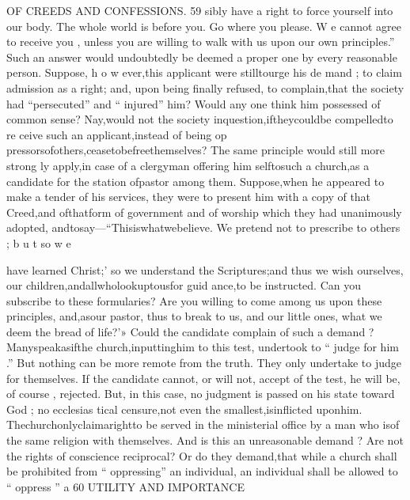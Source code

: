 \documentclass[
]{book}
\begin{document}
OF CREEDS AND CONFESSIONS. 59
sibly have a right to force yourself into our
body. The whole world is before you. Go
where you please. W e cannot agree to receive
you , unless you are willing to walk with us
upon our own principles.'' Such an answer
would undoubtedly be deemed a proper one
by every reasonable person. Suppose, h o w
ever,this applicant were stilltourge his de
mand ; to claim admission as a right; and,
upon being finally refused, to complain,that
the society had ``persecuted'' and `` injured''
him? Would any one think him possessed of
common sense? Nay,would not the society
inquestion,iftheycouldbe compelledto re
ceive such an applicant,instead of being op pressorsofothers,ceasetobefreethemselves?
The same principle would still more strong
ly apply,in case of a clergyman offering him
selftosuch a church,as a candidate for the
station ofpastor among them. Suppose,when
he appeared to make a tender of his services,
they were to present him with a copy of that
Creed,and ofthatform of government and of
worship which they had unanimously adopted, andtosay---``Thisiswhatwebelieve. We
pretend not to prescribe to others ; b u t so w e

have learned Christ;' so we understand the Scriptures;and thus we wish ourselves, our
children,andallwholookuptousfor guid ance,to be instructed. Can you subscribe to these formularies? Are you willing to come
among us upon these principles, and,asour pastor, thus to break to us, and our little ones, what we deem the bread of life?'» Could
the candidate complain of such a demand ? Manyspeakasifthe church,inputtinghim to this test, undertook to `` judge for him .'' But nothing can be more remote from the truth. They only undertake to judge for
themselves. If the candidate cannot, or will
not, accept of the test, he will be, of course ,
rejected. But, in this case, no judgment is
passed on his state toward God ; no ecclesias
tical censure,not even the smallest,isinflicted
uponhim. Thechurchonlyclaimarightto
be served in the ministerial office by a man
who isof the same religion with themselves. And is this an unreasonable demand ? Are
not the rights of conscience reciprocal? Or do they demand,that while a church shall be
prohibited from `` oppressing'' an individual, an individual shall be allowed to `` oppress '' a
60 UTILITY AND IMPORTANCE
\end{document}
